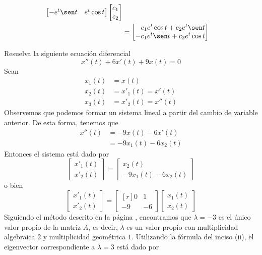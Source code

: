 \begin{example}
\begin{align*}
\begin{bmatrix}
            - e^t \sen t & e^t \cos t
        \end{bmatrix} \begin{bmatrix}
            c_1 \\
            c_2
        \end{bmatrix} \\
        & = \begin{bmatrix}
            \phantom{-} c_1e^t \cos t + c_2e^t \sen t \\
            -c_1e^t \sen t + c_2e^t \cos t
        \end{bmatrix}
    \end{align*}
\end{example}

\begin{example}
    Resuelva la siguiente ecuación diferencial
    $$x''(t) + 6x'(t) + 9x(t) = 0$$
    \solucion Sean
    \begin{align*}
        x_1(t) & = x(t) \\
        x_2(t) & = x'_1(t) = x'(t) \\
        x_3(t) & = x'_2(t) = x''(t)
    \end{align*}
    Observemos que podemos formar un sistema lineal a partir del cambio de variable anterior. De esta forma, tenemos que
    \begin{align*}
        x''(t) & = - 9x(t) - 6x'(t) \\
        & = - 9x_1(t) - 6x_2(t)
    \end{align*}
    Entonces el sistema está dado por
    $$\begin{bmatrix}
        x'_1(t) \\
        x'_2(t)
    \end{bmatrix} = \begin{bmatrix}
        x_2(t) \\
        - 9x_1(t) - 6x_2(t)
    \end{bmatrix}$$
    o bien
    $$\begin{bmatrix}
        x'_1(t) \\
        x'_2(t)
    \end{bmatrix} = \begin{bmatrix*}[r]
        0 & 1 \\
        - 9  & - 6
    \end{bmatrix*} \begin{bmatrix}
        x_1(t) \\
        x_2(t)
    \end{bmatrix}$$
    Siguiendo el método descrito en la página \pageref{metodo_eigen_2x2}, encontramos que $\lambda = -3$ es el único valor propio de la matriz $A$, es decir, $\lambda$ es un valor propio con multiplicidad algebraica $2$ y multiplicidad geométrica $1$. Utilizando la fórmula del inciso (ii), el eigenvector correspondiente a $\lambda = 3$ está dado por

\end{example}
